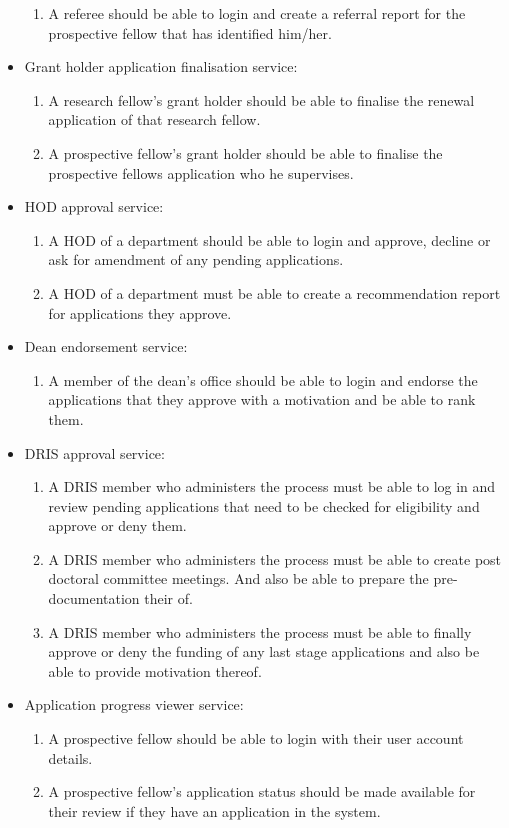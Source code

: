 \documentclass[12pt]{article}
\begin{document}
\begin{itemize}
			\begin{enumerate}		
				\item A referee should be able to login and create a referral report for the prospective fellow that has identified him/her.				 					
			\end{enumerate}
			\item Grant holder application finalisation service:
			\begin{enumerate}		
				\item A research fellow's grant holder should be able to finalise the renewal application of that research fellow.
				\item A prospective fellow's grant holder should be able to finalise the prospective fellows application who he supervises.				 					
			\end{enumerate}
			\item HOD approval service:
			\begin{enumerate}		
				\item A HOD of a department should be able to login and approve, decline or ask for amendment of any pending applications.
				\item A HOD of a department must be able to create a recommendation report for applications they approve.				 					
			\end{enumerate}
			\item Dean endorsement service:
			\begin{enumerate}		
				\item A member of the dean's office should be able to login and endorse the applications that they approve with a motivation and be able to rank them.				 					
			\end{enumerate}
			\item DRIS approval service:
			\begin{enumerate}		
				\item A DRIS member who administers the process must be able to log in and review pending applications that need to be checked for eligibility and approve or deny them.
				\item A DRIS member who administers the process must be able to create post doctoral committee meetings. And also be able to prepare the pre-documentation their of.
				\item A DRIS member who administers the process must be able to finally approve or deny the funding of any last stage applications and also be able to provide motivation thereof.				 					
			\end{enumerate}
			\item Application progress viewer service:
			\begin{enumerate}
				\item A prospective fellow should be able to login with their user account details.
				\item A prospective fellow's application status should be made available for their review if they have an application in the system.			
			\end{enumerate}
		\end{itemize}
\end{document}
